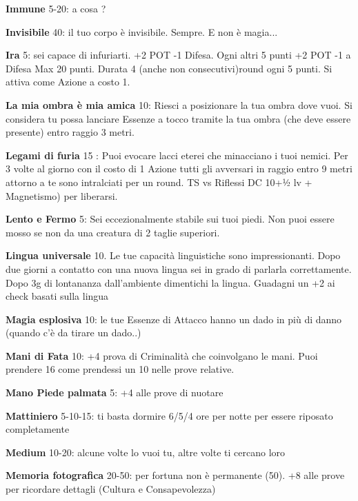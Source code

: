 \documentclass[a4paper,11pt,twoside,openany]{book}
\begin{document}
\textbf{Immune} 5-20: a cosa ?

\textbf{Invisibile} 40: il tuo corpo è invisibile. Sempre. E non è magia...

\textbf{Ira} 5: sei capace di infuriarti. +2 POT -1 Difesa. Ogni altri 5 punti +2 POT -1 a Difesa Max 20 punti. Durata 4 (anche non consecutivi)round ogni 5 punti. Si attiva come Azione a costo 1.

\textbf{La mia ombra è mia amica} 10: Riesci a posizionare la tua ombra dove vuoi. Si considera tu possa lanciare Essenze a tocco tramite la tua ombra (che deve essere presente) entro raggio 3 metri.

\textbf{Legami di furia} 15 : Puoi evocare lacci eterei che minacciano i tuoi nemici. Per 3 volte al giorno con il costo di 1 Azione tutti gli avversari in raggio entro 9 metri attorno a te sono intralciati per un round. TS vs Riflessi DC 10+½ lv + Magnetismo) per liberarsi.

\textbf{Lento e Fermo} 5: Sei eccezionalmente stabile sui tuoi piedi. Non puoi essere mosso se non da una creatura di 2 taglie superiori.

\textbf{Lingua universale} 10. Le tue capacità linguistiche sono impressionanti. Dopo due giorni a contatto con una nuova lingua sei in grado di parlarla correttamente. Dopo 3g di lontananza dall'ambiente dimentichi la lingua. Guadagni un +2 ai check basati sulla lingua

\textbf{Magia esplosiva} 10: le tue Essenze di Attacco hanno un dado in più di danno (quando c'è da tirare un dado..)

\textbf{Mani di Fata} 10: +4 prova di Criminalità che coinvolgano le mani. Puoi prendere 16 come prendessi un 10 nelle prove relative. 

\textbf{Mano Piede palmata} 5: +4 alle prove di nuotare

\textbf{Mattiniero} 5-10-15: ti basta dormire 6/5/4 ore per notte
per essere riposato completamente

\textbf{Medium} 10-20: alcune volte lo vuoi tu, altre volte ti cercano loro

\textbf{Memoria fotografica} 20-50: per fortuna non è permanente (50). +8 alle prove per ricordare dettagli (Cultura e Consapevolezza)
\end{document}
